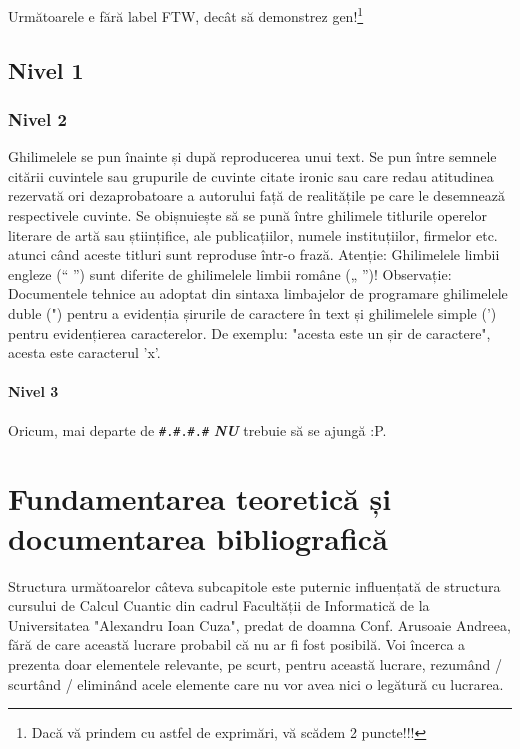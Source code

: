 \textcolor{gray}{\lipsum}

Următoarele e fără label FTW, decât să demonstrez gen!\footnote{Dacă vă prindem cu astfel de exprimări, vă scădem 2 puncte!!!}

\section{Nivel 1}
\label{cap:cap1:nivel1}

\subsection{Nivel 2}
\label{cap:cap1:nivel1:nivel2}

Ghilimelele se pun înainte și după reproducerea unui text. Se pun între semnele citării cuvintele sau grupurile de cuvinte citate ironic sau care redau atitudinea rezervată ori dezaprobatoare a autorului față de realitățile pe care le desemnează respectivele cuvinte. Se obișnuiește să se pună între ghilimele titlurile operelor literare de artă sau științifice, ale publicațiilor, numele instituțiilor, firmelor etc. atunci când aceste titluri sunt reproduse într-o frază. 
Atenție: Ghilimelele limbii engleze (“ ”) sunt diferite de ghilimelele limbii române („ ”)!
Observație: Documentele tehnice au adoptat din sintaxa limbajelor de programare ghilimelele duble (") pentru a evidenția șirurile de caractere în text și ghilimelele simple (') pentru evidențierea caracterelor. De exemplu: "acesta este un șir de caractere", acesta este caracterul 'x'.

\subsubsection{Nivel 3}
\label{cap:cap1:nivel1:nivel2:nivel3}

Oricum, mai departe de \verb|#.#.#.#| \textbf{\textit{NU}} trebuie să se ajungă :P.

\fi


\chapter{Fundamentarea teoretică și documentarea bibliografică}
\label{cap:cap1}

Structura următoarelor câteva subcapitole este puternic influențată de structura cursului de Calcul Cuantic din cadrul Facultății de Informatică de la Universitatea "Alexandru Ioan Cuza", predat de doamna Conf. Arusoaie Andreea, fără de care această lucrare probabil că nu ar fi fost posibilă. Voi încerca a prezenta doar elementele relevante, pe scurt, pentru această lucrare, rezumând / scurtând / eliminând acele elemente care nu vor avea nici o legătură cu lucrarea.

